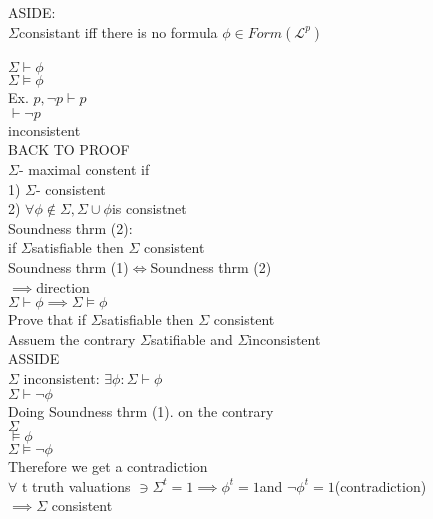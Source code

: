 \documentclass[12pt,oneside,fleqn]{article}
\theoremstyle{definition}
\newcommand{\Lp}{\mathcal{L}^p}
\begin{document}
ASIDE: \\
$\Sigma$consistant iff there is no formula $\phi \in Form (\Lp) $\\ \\
$\Sigma \vdash \phi$ \\
$\Sigma \vDash \phi $ \\
 
Ex. ${p , \neg p} \vdash p$ \\
			    $ \vdash \neg p$ \\
inconsistent \\
BACK TO PROOF \\
 
$\Sigma $- maximal constent if  \\
1) $\Sigma $- consistent \\
2) $\forall \phi \not \in \Sigma, \Sigma \cup { \phi } $is consistnet \\



Soundness thrm (2): \\
if $\Sigma $satisfiable then $\Sigma$ consistent \\


Soundness thrm (1)$ \iff $Soundness thrm (2) \\


$\implies $direction \\
$\Sigma \vdash \phi \implies \Sigma \vDash \phi$ \\
Prove that if $\Sigma $satisfiable then $\Sigma$ consistent \\
Assuem the contrary $\Sigma $satifiable and $\Sigma $inconsistent \\

ASSIDE \\
$\Sigma$ inconsistent: $\exists \phi : \Sigma \vdash \phi $ \\
$\Sigma \vdash \neg \phi$ \\

Doing Soundness thrm (1). on the contrary \\
$\Sigma$ \\
$ \vDash \phi$ \\
$\Sigma \vDash \neg \phi$ \\
Therefore we get a contradiction \\
$\forall$ t truth valuations $\ni \Sigma ^t = 1 \implies \phi^t = 1 $and $\neg \phi^t = 1 $(contradiction) \\
$\implies  \Sigma$ consistent  \\
\end{document}
